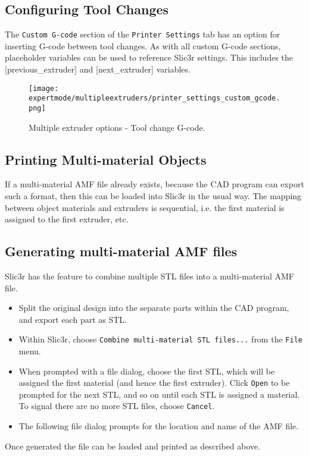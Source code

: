 
\subsection{Configuring Tool Changes} %
\label{sub:configuring_tool_changes}

The \texttt{Custom G-code} section of the \texttt{Printer Settings} tab has an option for inserting G-code between tool changes.  As with all custom G-code sections, placeholder variables can be used to reference Slic3r settings.  This includes the [previous\_extruder] and [next\_extruder] variables.

\begin{figure}[H]
\centering
\texttt{[image: expertmode/multipleextruders/printer\_settings\_custom\_gcode.png]}
\caption{Multiple extruder options - Tool change G-code.}
\label{fig:printer_settings_custom_gcode}
\end{figure}



\subsection{Printing Multi-material Objects} %
\label{sub:printing_multi_material_objects}

If a multi-material AMF file already exists, because the CAD program can export such a format, then this can be loaded into Slic3r in the usual way.  The mapping between object materials and extruders is sequential, i.e. the first material is assigned to the first extruder, etc.



\subsection{Generating multi-material AMF files} %
\label{sub:generating_multi_material_amf_files}

Slic3r has the feature to combine multiple STL files into a multi-material AMF file.

\begin{itemize}
    \item Split the original design into the separate parts within the CAD program, and export each part as STL.
    \item Within Slic3r, choose \texttt{Combine multi-material STL files...} from the \texttt{File} menu.
    \item When prompted with a file dialog, choose the first STL, which will be assigned the first material (and hence the first extruder). Click \texttt{Open} to be prompted for the next STL, and so on until each STL is assigned a material.  To signal there are no more STL files, choose \texttt{Cancel}.
    \item The following file dialog prompts for the location and name of the AMF file.
\end{itemize}

Once generated the file can be loaded and printed as described above.


